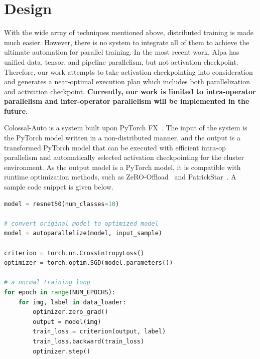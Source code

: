 

\section{Design}

With the wide array of techniques mentioned above, distributed training is made much easier. However, there is no system to integrate all of them to achieve the ultimate automation for parallel training. In the most recent work, Alpa has unified data, tensor, and pipeline parallelism, but not activation checkpoint. Therefore, our work attempts to take activation checkpointing into consideration and generates a near-optimal execution plan which includes both parallelization and activation checkpoint. \textbf{Currently, our work is limited to intra-operator parallelism and inter-operator parallelism will be implemented in the future.}

Colossal-Auto is a system built upon PyTorch FX~\cite{torch-fx}. 
The input of the system is the PyTorch model written in a non-distributed manner, and the output is a transformed PyTorch model that can be executed with efficient intra-op parallelism and automatically selected activation checkpointing for the cluster environment.
As the output model is a PyTorch model, it is compatible with runtime optimization methods, such as ZeRO-Offload~\cite{ren2021zero} and PatrickStar~\cite{fang2022parallel, huang2022elixir}. A sample code snippet is given below.


\begin{lstlisting}[language=Python, label=demo, caption=an example to show how to use our system with \textit{\textbf{one-line changing}} from user source code., label=code sample]
model = resnet50(num_classes=10)

# convert original model to optimized model
model = autoparallelize(model, input_sample)

criterion = torch.nn.CrossEntropyLoss()
optimizer = torch.optim.SGD(model.parameters())

# a normal training loop
for epoch in range(NUM_EPOCHS):
    for img, label in data_loader:
        optimizer.zero_grad()
        output = model(img)
        train_loss = criterion(output, label)
        train_loss.backward(train_loss)
        optimizer.step()
\end{lstlisting}


